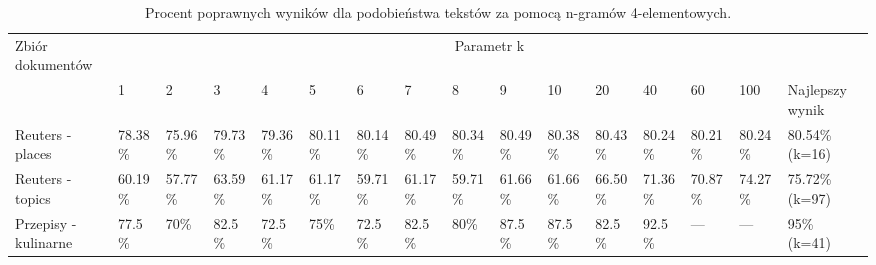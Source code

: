 \documentclass{classrep}
\begin{document}
\begingroup
{\scriptsize  
\setlength{\LTleft}{-20cm plus -1fill}
\setlength{\LTright}{\LTleft}

\begin{longtable}{|p{1cm}|p{0.7cm}|p{0.7cm}|p{0.7cm}|p{0.7cm}|p{0.7cm}|p{0.7cm}|p{0.7cm}|p{0.7cm}|p{0.7cm}|p{0.7cm}|p{0.7cm}|p{0.7cm}|p{0.7cm}|p{0.7cm}|p{1.1cm}|}
\caption{ Procent poprawnych wyników dla podobieństwa tekstów za pomocą n-gramów 4-elementowych.}\\ 
\hline

Zbiór
dokumentów

 &\multicolumn{15}{c|}{Parametr k}\\
\cline{2-16}
& 1
& 2
& 3
& 4
& 5
& 6
& 7
& 8
& 9
& 10
& 20
& 40
& 60
& 100
& Najlepszy wynik
\\ \hline\hline
Reuters
- places
& 78.38\%	%
& 75.96\%	%
& 79.73\%	%
& 79.36\%	%
& 80.11\%	%
& 80.14\%	%
& 80.49\%	%
& 80.34\%	%
& 80.49\%	%
& 80.38\%	%
& 80.43\%	%
& 80.24\%	%
& 80.21\%	%
& 80.24\%	%
& 80.54\%	(k=16)
\\ \hline
Reuters
- topics
& 60.19\%	%
& 57.77\%	%
& 63.59\%	%
& 61.17\%	%
& 61.17\%	%
& 59.71\%	%
& 61.17\%	%
& 59.71\%	%
& 61.66\%	%
& 61.66\%	%
& 66.50\%	%
& 71.36\%	%
& 70.87\%	%
& 74.27\%	%
& 75.72\%	(k=97)
\\ \hline
Przepisy
- kulinarne 
& 77.5\%	%
& 70\%		%
& 82.5\%	%
& 72.5\%	%
& 75\%		%
& 72.5\%	%
& 82.5\%	%
& 80\%		%
& 87.5\%	%
& 87.5\%	%
& 82.5\%	%
& 92.5\%	%
& ---		%
& ---		%
& 95\% (k=41)
\\ \hline
\end{longtable}
}
\endgroup



\end{document}
